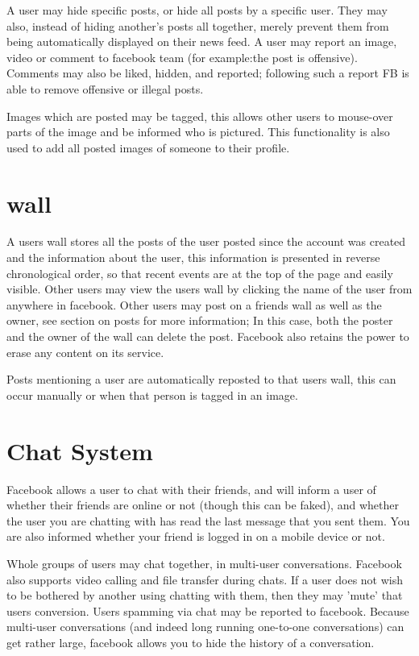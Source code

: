A user may hide specific posts, or hide all posts by a specific user. They may
also, instead of hiding another's posts all together, merely prevent them from
being automatically displayed on their news feed. A user may report an image,
video or comment to facebook team (for example:the post is offensive). Comments
may also be liked, hidden, and reported; following such a report FB is able to
remove offensive or illegal posts.

Images which are posted may be tagged, this allows other users to mouse-over
parts of the image and be informed who is pictured. This functionality is also
used to add all posted images of someone to their profile.

\section{wall}
A users wall stores all the posts of the user posted since the account was
created and the information about the user, this information is presented in
reverse chronological order, so that recent events are at the top of the page
and easily visible. Other users may view the users wall by clicking the name of
the user from anywhere in facebook. Other users may post on a friends wall as
well as the owner, see section on posts for more information; In this case, both
the poster and the owner of the wall can delete the post. Facebook also retains
the power to erase any content on its service.

Posts mentioning a user are automatically reposted to that users wall, this can
occur manually or when that person is tagged in an image.

\section{Chat System}
Facebook allows a user to chat with their friends, and will inform a user of
whether their friends are online or not (though this can be faked), and whether
the user you are chatting with has read the last message that you sent them. You
are also informed whether your friend is logged in on a mobile device or not.

Whole groups of users may chat together, in multi-user conversations. Facebook
also supports video calling and file transfer during chats. If a user does not
wish to be bothered by another using chatting with them, then they may 'mute'
that users conversion. Users spamming via chat may be reported to facebook.
Because multi-user conversations (and indeed long running one-to-one
conversations) can get rather large, facebook allows you to hide the history of
a conversation.

